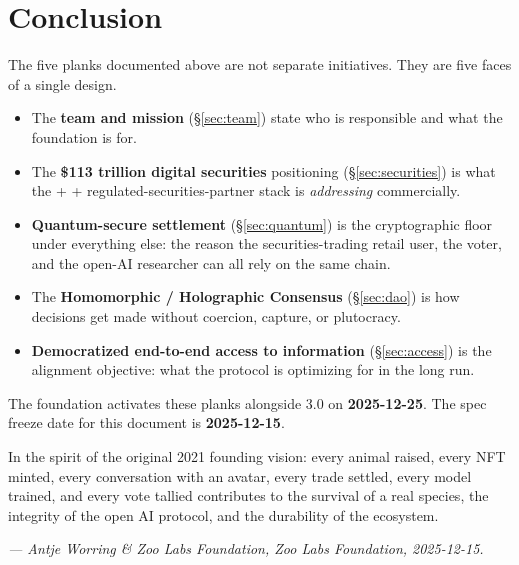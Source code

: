 \section{Conclusion}
\label{sec:conclusion}

The five planks documented above are not separate initiatives. They are
five faces of a single design.

\begin{itemize}[nosep,leftmargin=1.2em]
\item The \textbf{team and mission} (\S\ref{sec:team}) state who is
  responsible and what the foundation is for.
\item The \textbf{\$113 trillion digital securities} positioning
  (\S\ref{sec:securities}) is what the \Zoo{} + \Lux{} + regulated-securities-partner
  stack is \emph{addressing} commercially.
\item \textbf{Quantum-secure settlement} (\S\ref{sec:quantum}) is the
  cryptographic floor under everything else: the reason the
  securities-trading retail user, the \DAO{} voter, and the open-AI
  researcher can all rely on the same chain.
\item The \textbf{Homomorphic / Holographic Consensus \DAO{}}
  (\S\ref{sec:dao}) is how decisions get made without coercion,
  capture, or plutocracy.
\item \textbf{Democratized end-to-end access to information}
  (\S\ref{sec:access}) is the alignment objective: what the protocol
  is optimizing for in the long run.
\end{itemize}

The foundation activates these planks alongside \Lux{} \Quasar{} 3.0
on \textbf{2025-12-25}. The spec freeze date for this document is
\textbf{2025-12-15}.

In the spirit of the original 2021 founding vision: every animal
raised, every NFT minted, every conversation with an avatar, every
trade settled, every model trained, and every vote tallied
contributes to the survival of a real species, the integrity of the
open AI protocol, and the durability of the \Zoo{} ecosystem.

\medskip
\noindent\textit{--- Antje Worring \& Zoo Labs Foundation, Zoo Labs Foundation,
2025-12-15.}
